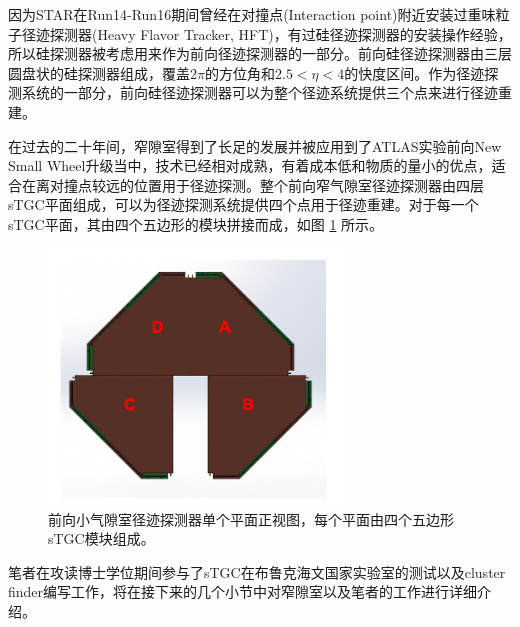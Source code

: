 因为STAR在Run14-Run16期间曾经在对撞点(Interaction point)附近安装过重味粒子径迹探测器(Heavy Flavor Tracker, HFT)，有过硅径迹探测器的安装操作经验，所以硅探测器被考虑用来作为前向径迹探测器的一部分。前向硅径迹探测器由三层圆盘状的硅探测器组成，覆盖$2\pi$的方位角和$2.5 < \eta < 4$的快度区间。作为径迹探测系统的一部分，前向硅径迹探测器可以为整个径迹系统提供三个点来进行径迹重建。

在过去的二十年间，窄隙室得到了长足的发展并被应用到了ATLAS实验前向New Small Wheel升级当中，技术已经相对成熟，有着成本低和物质的量小的优点，适合在离对撞点较远的位置用于径迹探测。整个前向窄气隙室径迹探测器由四层sTGC平面组成，可以为径迹探测系统提供四个点用于径迹重建。对于每一个sTGC平面，其由四个五边形的模块拼接而成，如图 \ref{fig:sTGC} 所示。
\begin{figure}[htb]
    \begin{center}
    \includegraphics[width=0.7\textwidth,clip]{figures/Chapter2/sTGC.png}
    \end{center}
    \caption[前向小气隙室径迹探测器单个平面正视图]{前向小气隙室径迹探测器单个平面正视图，每个平面由四个五边形sTGC模块组成。}
    \label{fig:sTGC}
\end{figure}

笔者在攻读博士学位期间参与了sTGC在布鲁克海文国家实验室的测试以及cluster finder编写工作，将在接下来的几个小节中对窄隙室以及笔者的工作进行详细介绍。